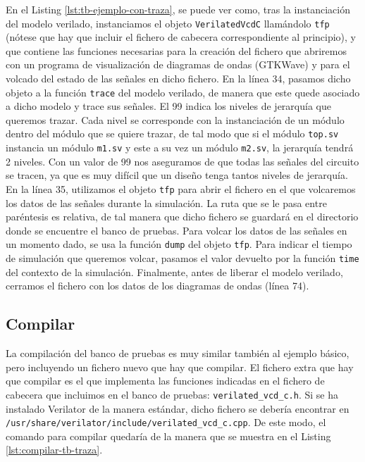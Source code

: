 En el Listing \ref{lst:tb-ejemplo-con-traza}, se puede ver como, tras la instanciación del modelo verilado, instanciamos el objeto \verb|VerilatedVcdC| llamándolo \verb|tfp| (nótese que hay que incluir el fichero de cabecera correspondiente al principio), y que contiene las funciones necesarias para la creación del fichero que abriremos con un programa de visualización de diagramas de ondas (GTKWave) y para el volcado del estado de las señales en dicho fichero. En la línea 34, pasamos dicho objeto a la función \verb|trace| del modelo verilado, de manera que este quede asociado a dicho modelo y trace sus señales. El 99 indica los niveles de jerarquía que queremos trazar. Cada nivel se corresponde con la instanciación de un módulo dentro del módulo que se quiere trazar, de tal modo que si el módulo \verb|top.sv| instancia un módulo \verb|m1.sv| y este a su vez un módulo \verb|m2.sv|, la jerarquía tendrá 2 niveles. Con un valor de 99 nos aseguramos de que todas las señales del circuito se tracen, ya que es muy difícil que un diseño tenga tantos niveles de jerarquía. En la línea 35, utilizamos el objeto \verb|tfp| para abrir el fichero en el que volcaremos los datos de las señales durante la simulación. La ruta que se le pasa entre paréntesis es relativa, de tal manera que dicho fichero se guardará en el directorio donde se encuentre el banco de pruebas. Para volcar los datos de las señales en un momento dado, se usa la función \verb|dump| del objeto \verb|tfp|. Para indicar el tiempo de simulación que queremos volcar, pasamos el valor devuelto por la función \verb|time| del contexto de la simulación. Finalmente, antes de liberar el modelo verilado, cerramos el fichero con los datos de los diagramas de ondas (línea 74).

\begin{center}
	
\end{center}


\subsection{Compilar}
La compilación del banco de pruebas es muy similar también al ejemplo básico, pero incluyendo un fichero nuevo que hay que compilar. El fichero extra que hay que compilar es el que implementa las funciones indicadas en el fichero de cabecera que incluimos en el banco de pruebas: \verb|verilated_vcd_c.h|. Si se ha instalado Verilator de la manera estándar, dicho fichero se debería encontrar en \linebreak\verb|/usr/share/verilator/include/verilated_vcd_c.cpp|. De este modo, el comando para compilar quedaría de la manera que se muestra en el Listing \ref{lst:compilar-tb-traza}.

